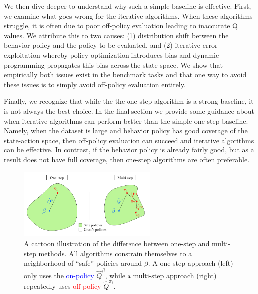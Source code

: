 We then dive deeper to understand why such a simple baseline is effective. First, we examine what goes wrong for the iterative algorithms. When these algorithms struggle, it is often due to poor off-policy evaluation leading to inaccurate Q values. We attribute this to two causes: (1) distribution shift between the behavior policy and the policy to be evaluated, and (2) iterative error exploitation whereby policy optimization introduces bias and dynamic programming propagates this bias across the state space.
We show that empirically both issues exist in the benchmark tasks and that one way to avoid these issues is to simply avoid off-policy evaluation entirely.




Finally, we recognize that while the the one-step algorithm is a strong baseline, it is not always the best choice. In the final section we provide some guidance about when iterative algorithms can perform better than the simple one-step baseline. Namely, when the dataset is large and behavior policy has good coverage of the state-action space, then off-policy evaluation can succeed and iterative algorithms can be effective.
In contrast, if the behavior policy is already fairly good, but as a result does not have full coverage, then one-step algorithms are often preferable.

\begin{figure}[h]
    \centering
    \includegraphics[width=0.6\textwidth]{figures/offline-rl/cartoon.png}
    \vspace{-0.2cm}
    \caption{A cartoon illustration of the difference between one-step and multi-step methods. All algorithms constrain themselves to a neighborhood of ``safe'' policies around $ \beta$. A one-step approach (left) only uses the \textcolor{blue}{on-policy} $ \widehat Q^\beta$, while a multi-step approach (right) repeatedly uses \textcolor{red}{off-policy} $\widehat Q^{\pi_i}$.
    }
    \label{fig:cartoon}
\end{figure}

